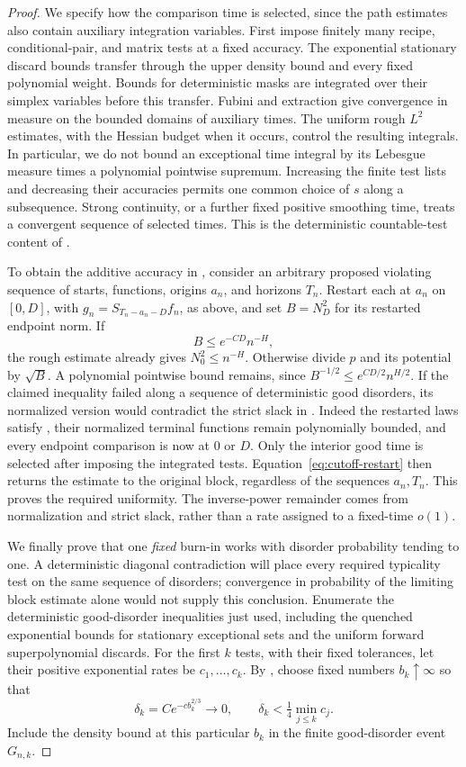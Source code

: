 \begin{proof}
We specify how the comparison time is selected, since the path estimates
also contain auxiliary integration variables.  First impose finitely many
recipe, conditional-pair, and matrix tests at a fixed accuracy.  The exponential stationary
discard bounds transfer through the upper density bound and every
fixed polynomial weight.  Bounds for deterministic masks are
integrated over their simplex variables before this transfer.  Fubini
and extraction give convergence in measure on the bounded domains of
auxiliary times.  The uniform rough $L^2$ estimates, with the Hessian
budget when it occurs, control the resulting integrals.  In
particular, we do not bound an exceptional time integral by its
Lebesgue measure times a polynomial pointwise supremum.  Increasing
the finite test lists and decreasing their accuracies permits one
common choice of $s$ along a subsequence.  Strong continuity, or a
further fixed positive smoothing time, treats a convergent sequence
of selected times.  This is the deterministic countable-test content
of .

To obtain the additive accuracy in , consider an
arbitrary proposed violating sequence of starts, functions, origins
$a_n$, and horizons $T_n$.  Restart each at $a_n$ on $[0,D]$, with
$g_n=S_{T_n-a_n-D}f_n$, as above, and set $B=N_D^2$ for its
restarted endpoint norm.  If
\[
 B\le e^{-CD}n^{-H},
\]
the rough estimate already gives $N_0^2\le n^{-H}$.
Otherwise divide $p$ and its potential by $\sqrt B$.  A polynomial
pointwise bound remains, since $B^{-1/2}\le e^{CD/2}n^{H/2}$.
If the claimed inequality failed along a sequence of deterministic
good disorders, its normalized version would contradict the strict
slack in .  Indeed the restarted laws
satisfy , their normalized terminal
functions remain polynomially bounded, and every endpoint comparison
is now at $0$ or $D$.  Only the interior good time is selected after
imposing the integrated tests.  Equation~\eqref{eq:cutoff-restart}
then returns the estimate to the original block, regardless of the
sequences $a_n,T_n$.  This proves the required uniformity.  The
inverse-power remainder comes from normalization and strict slack,
rather than a rate assigned to a fixed-time $o(1)$.

We finally prove that one \emph{fixed} burn-in works with disorder
probability tending to one.  A deterministic diagonal contradiction
will place every required typicality test on the same sequence of
disorders; convergence in probability of the limiting block estimate
alone would not supply this conclusion.  Enumerate the
deterministic good-disorder inequalities just used, including the
quenched exponential bounds for stationary exceptional sets and the
uniform forward superpolynomial discards.  For the first $k$ tests,
with their fixed tolerances, let their positive exponential rates be
$c_1,\ldots,c_k$.  By , choose fixed numbers
$b_k\uparrow\infty$ so that
\[
 \delta_k=C e^{-c b_k^{2/3}}\longrightarrow0,
 \qquad
 \delta_k<\tfrac14\min_{j\le k}c_j.
\]
Include the density bound at this particular $b_k$ in the finite
good-disorder event $G_{n,k}$.


\end{proof}
